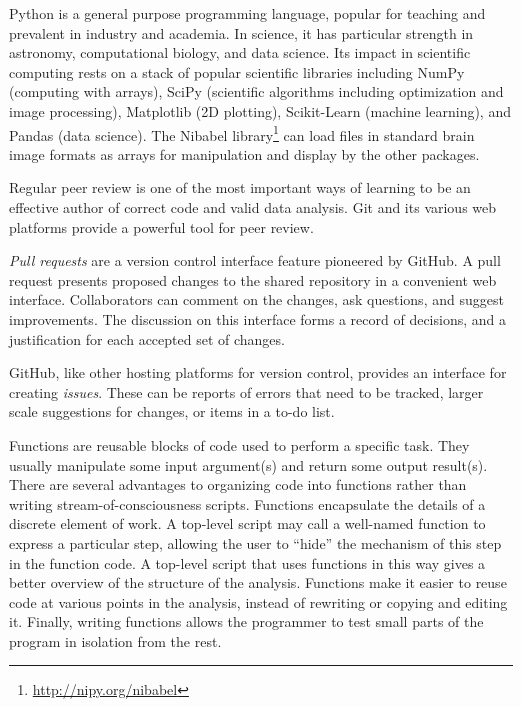 Python is a general purpose programming language,
popular for teaching and prevalent in industry and academia.
In science, it has particular strength in
astronomy, computational biology, and data science.
Its impact in scientific computing rests on a stack of popular scientific
libraries including NumPy (computing with arrays), SciPy (scientific
algorithms including optimization and image processing), Matplotlib (2D
plotting), Scikit-Learn (machine learning), and Pandas (data science).  The
Nibabel library\footnote{\url{http://nipy.org/nibabel}\label{nibabel}} can
load files in standard brain image formats as arrays for manipulation and
display by the other packages.

Regular peer review is one of the most important ways of learning
to be an effective author of correct code and valid data analysis.  Git and its
various web platforms provide a powerful tool for peer review.

\emph{Pull requests} are a version control interface feature pioneered by
GitHub.  A pull request presents proposed changes to the shared
repository in a convenient web interface. Collaborators can comment on the
changes, ask questions, and suggest improvements.  The discussion on this
interface forms a record of decisions, and a justification for each accepted
set of changes.

GitHub, like other hosting platforms for version control, provides an
interface for creating \emph{issues}.  These can be reports of errors
that need to be tracked, larger scale suggestions for
changes, or items in a to-do list.

Functions are reusable blocks of code used to perform a specific task.
They usually manipulate some input argument(s) and return some output
result(s).
There are several advantages to organizing code into functions rather
than writing stream-of-consciousness scripts.
Functions encapsulate the details of a discrete element of
work.  A top-level script may call a well-named function to express a
particular step, allowing the user to ``hide'' the mechanism of this step in
the function code.  A top-level script that uses functions in this way gives a
better overview of the structure of the analysis.
Functions make it easier to reuse code at various points in the
analysis, instead of rewriting or copying and editing it.
Finally, writing functions allows the programmer to test small parts of the
program in isolation from the rest.

